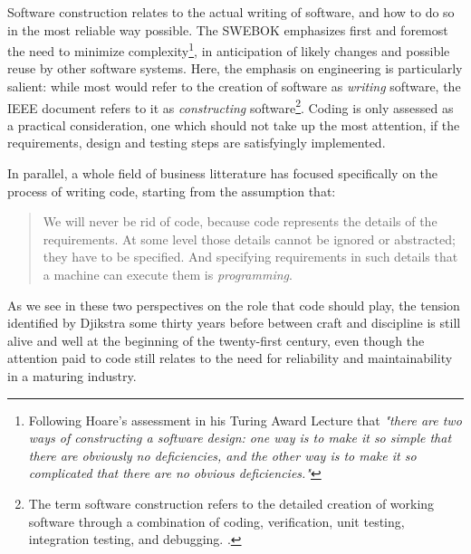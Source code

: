 Software construction relates to the actual writing of software, and how to do so in the most reliable way possible. The SWEBOK emphasizes first and foremost the need to minimize complexity\footnote{Following Hoare's assessment in his Turing Award Lecture that \emph{"there are two ways of constructing a software design: one way is to make it so simple that there are obviously no deficiencies, and the other way is to make it so complicated that there are no obvious deficiencies."}}, in anticipation of likely changes and possible reuse by other software systems. Here, the emphasis on engineering is particularly salient: while most would refer to the creation of software as \emph{writing} software, the IEEE document refers to it as \emph{constructing} software\footnote{The term software construction refers to the detailed creation of working software through a combination of coding, verification, unit testing, integration testing, and debugging. \citep{bourque_swebok_2014}.}. Coding is only assessed as a practical consideration, one which should not take up the most attention, if the requirements, design and testing steps are satisfyingly implemented.

In parallel, a whole field of business litterature \citep{martin_clean_2008,hendrickson_software_2002,fowler_refactoring_1999,mcconnell_code_2004} has focused specifically on the process of writing code, starting from the assumption that:

\begin{quote}
  We will never be rid of code, because code represents the details of the requirements. At some level those details cannot be ignored or abstracted; they have to be specified. And specifying requirements in such details that a machine can execute them is \emph{programming}. \citep{martin_clean_2008}
\end{quote}

As we see in these two perspectives on the role that code should play, the tension identified by Djikstra some thirty years before between craft and discipline is still alive and well at the beginning of the twenty-first century, even though the attention paid to code still relates to the need for reliability and maintainability in a maturing industry.

